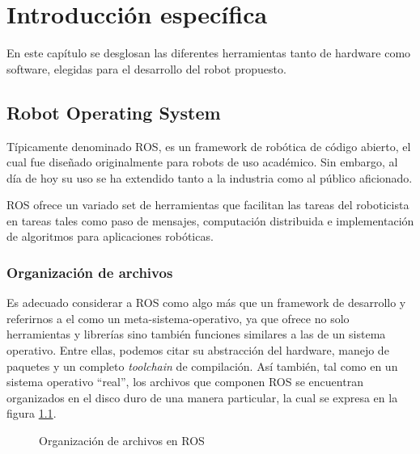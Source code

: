 \chapter{Introducción específica}

\label{Capitulo2}

En este capítulo se desglosan las diferentes herramientas tanto de hardware como software, elegidas para el desarrollo del robot propuesto.

\section{Robot Operating System}

Típicamente denominado ROS, es un framework de robótica de código abierto, el cual fue diseñado originalmente para robots de uso académico. Sin embargo, al día de hoy su uso se ha extendido tanto a la industria como al público aficionado.

ROS ofrece un variado set de herramientas que facilitan las tareas del roboticista en tareas tales como paso de mensajes, computación distribuida e implementación de algoritmos para aplicaciones robóticas.

\subsection{Organización de archivos}

Es adecuado considerar a ROS como algo más que un framework de desarrollo y referirnos a el como un meta-sistema-operativo, ya que ofrece no solo herramientas y librerías sino también funciones similares a las de un sistema operativo. Entre ellas, podemos citar su abstracción del hardware, manejo de paquetes y un completo \textit{toolchain} de compilación. Así también, tal como en un sistema operativo ``real'', los archivos que componen ROS se encuentran organizados en el disco duro de una manera particular, la cual se expresa en la figura \ref{fig:rosSistemaDeArchivos}.

\begin{figure}[ht]
    \centering
    \def\svgwidth{350pt}
    
    \caption{Organización de archivos en ROS}
    \label{fig:rosSistemaDeArchivos}
\end{figure}

